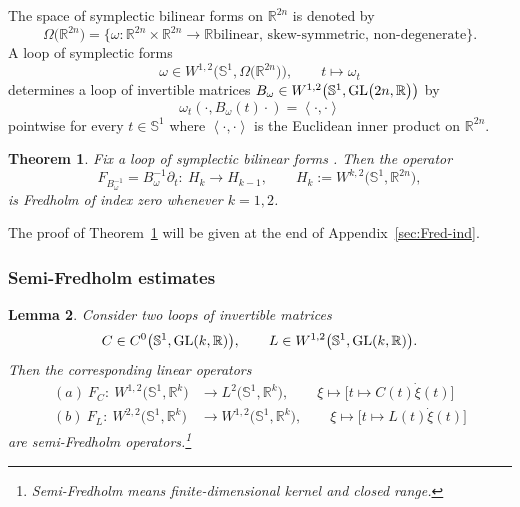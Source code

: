 \documentclass[pdftex]{sigma}
\numberwithin{equation}{section}
\newtheorem{Theorem}{Theorem}[section]
\newtheorem{Lemma}[Theorem]{Lemma}
\newcommand{\R}{{\mathbb{R}}}
\renewcommand{\SS}{{\mathbb{S}}}
\newcommand{\GL}{{\rm GL}}
\newcommand{\INNER}[2]{\left\langle #1, #2\right\rangle}
\newcommand{\p}{{\partial}}
\newcommand{\1}{{{\mathchoice {\rm 1\mskip-4mu l} {\rm 1\mskip-4mu l}
{\rm 1\mskip-4.5mu l} {\rm 1\mskip-5mu l}}}}
\begin{document}
The space of symplectic bilinear forms on $\R^{2n}$ is denoted by
\[
 \Omega\bigl(\R^{2n}\bigr)
 =\bigl\{\text{$\omega\colon \R^{2n}\times \R^{2n}\to \R$
 bilinear, skew-symmetric, non-degenerate}\bigr\} .
\]
A loop of symplectic forms
\begin{equation}\label{eq:loop-omega}
 \omega\in W^{1,2}\bigl(\SS^1,\Omega\bigl(\R^{2n}\bigr)\bigr)
 ,\qquad
 t\mapsto \omega_t
\end{equation}
determines a loop of invertible matrices
$B_\omega\in W^{1,2}\bigl(\SS^1,\GL\bigl(2n,\R\bigr)\bigr)$ by
\[
 \omega_t (\cdot,B_\omega(t)\cdot )=\INNER{\cdot}{\cdot}
\]
pointwise for every $t\in\SS^1$ where $\INNER{\cdot}{\cdot}$ is the
Euclidean inner product on $\R^{2n}$.

\begin{Theorem}\label{thm:Fredholm-F_C}
Fix a loop of symplectic bilinear forms
\smash{$\omega\in W^{1,2}\bigl(\SS^1,\Omega\bigl(\R^{2n}\bigr)\bigr)$}.
Then the operator
\[
 F_{B_\omega^{-1}}=B_\omega^{-1}\p_t
 \colon\ H_{k}\to H_{k-1}
 ,\qquad
 H_k:=W^{k,2}\bigl(\SS^1,\R^{2n}\bigr) ,
\]
is Fredholm of index zero
whenever $k=1,2$.
\end{Theorem}

The proof of Theorem~\ref{thm:Fredholm-F_C}
will be given at the end of Appendix~\ref{sec:Fred-ind}.



\subsubsection*{Semi-Fredholm estimates}

\begin{Lemma}\label{le:sF-1}
Consider two loops of invertible matrices
\[
 C\in C^0\bigl(\SS^1,\GL(k,\R)\bigr)
 ,\qquad
 L\in W^{1,2}\bigl(\SS^1,\GL(k,\R)\bigr) .
\]
Then the corresponding linear operators
\begin{equation}\label{eq:sF-1}
\begin{split}
 \text{$(a)$}\
 F_C\colon\ W^{1,2}\bigl(\SS^1,\R^k\bigr)&\to L^2 \bigl(\SS^1,\R^k\bigr)
 ,\qquad
 \xi\mapsto \bigl[t\mapsto C(t)\dot\xi(t)\bigr]
\\
 \text{$(b)$}\
 F_L\colon\ W^{2,2}\bigl(\SS^1,\R^k\bigr)&\to W^{1,2}\bigl(\SS^1,\R^k\bigr)
 ,\qquad
 \xi\mapsto \bigl[t\mapsto L(t)\dot\xi(t)\bigr]
\end{split}
\end{equation}
are semi-Fredholm operators.\footnote{Semi-Fredholm means finite-dimensional kernel and closed range.}
\end{Lemma}
\end{document}
